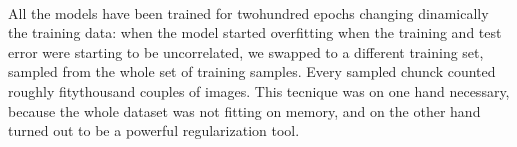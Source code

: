 \\
All the models have been trained for twohundred epochs changing dinamically the training data: when the model started overfitting \ie when the training and test error were starting to be uncorrelated, we swapped to a different training set, sampled from the whole set of training samples. Every sampled chunck counted roughly fitythousand couples of images. This tecnique was on one hand necessary, because the whole dataset was not fitting on memory, and on the other hand turned out to be a powerful regularization tool.

%

